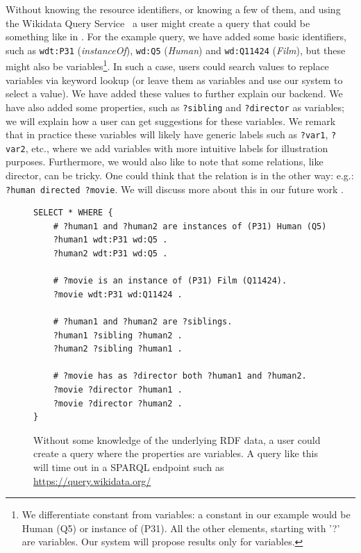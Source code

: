 Without knowing the resource identifiers, or knowing a few of them, and using the Wikidata Query Service~\cite{wikidataQueryService} a user might create a query that could be something like in . 
For the example query, we have added some basic identifiers, such as \texttt{wdt:P31} (\textit{instanceOf}), \texttt{wd:Q5} (\textit{Human}) and \texttt{wd:Q11424} (\textit{Film}), but these might also be variables\footnote{We differentiate constant from variables: a constant in our example would be Human (Q5) or instance of (P31). All the other elements, starting with '?' are variables. Our system will propose results only for variables.}. 
In such a case, users could search values to replace variables via keyword lookup (or leave them as variables and use our system to select a value). 
We have added these values to further explain our backend. We have also added some properties, such as \texttt{?sibling} and \texttt{?director} as variables; we will explain how a user can get suggestions for these variables.
We remark that in practice these variables will likely have generic labels such as \texttt{?var1}, \texttt{?var2}, etc., where we add variables with more intuitive labels for illustration purposes. 
Furthermore, we would also like to note that some relations, like director, can be tricky. One could think that the relation is in the other way: e.g.: \texttt{?human directed ?movie}. We will discuss more about this in our future work .

\begin{figure}[H]
\begin{verbatim}
SELECT * WHERE {
    # ?human1 and ?human2 are instances of (P31) Human (Q5)
    ?human1 wdt:P31 wd:Q5 .
    ?human2 wdt:P31 wd:Q5 .
    
    # ?movie is an instance of (P31) Film (Q11424).
    ?movie wdt:P31 wd:Q11424 .
    
    # ?human1 and ?human2 are ?siblings.
    ?human1 ?sibling ?human2 .
    ?human2 ?sibling ?human1 .
    
    # ?movie has as ?director both ?human1 and ?human2.
    ?movie ?director ?human1 .
    ?movie ?director ?human2 .
}
\end{verbatim}
\caption{Without some knowledge of the underlying RDF data, a user could create a query where the properties are variables. A query like this will time out in a SPARQL endpoint such as \url{https://query.wikidata.org/}}
\label{fig:siblingsSPARQL}
\end{figure}


